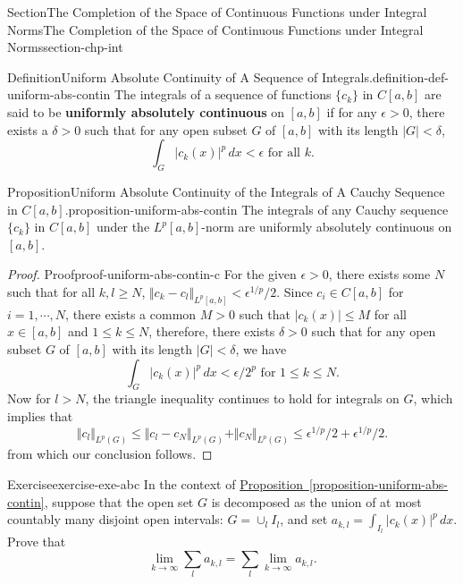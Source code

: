 \documentclass[oneside,10pt,]{article}
\newcommand{\xreffont}{\relax}
\newcommand{\terminology}[1]{\textbf{#1}}
\numberwithin{equation}{section}
\begin{document}
\begin{sectionptx}{Section}{The Completion of the Space of Continuous Functions under Integral Norms}{}{The Completion of the Space of Continuous Functions under Integral Norms}{}{}{section-chp-int}
\begin{definition}{Definition}{Uniform Absolute Continuity of A Sequence of Integrals.}{definition-def-uniform-abs-contin}
The integrals of a sequence of functions \(\{ c_{k}\}\)  in \(C[a, b]\) are said to be \terminology{uniformly absolutely continuous} on \([a, b]\) if for any \(\epsilon > 0\), there exists a \(\delta > 0\) such that for any open subset \(G\) of \([a, b]\) with its length \(|G| < \delta\),%
\begin{equation*}
\int_{G} |c_{k}(x)|^{p}\, dx < \epsilon \text{ for all } k.
\end{equation*}
%
\end{definition}
\begin{proposition}{Proposition}{Uniform Absolute Continuity of the Integrals of A Cauchy Sequence in \(C[a, b]\).}{}{proposition-uniform-abs-contin}%
The integrals of any  Cauchy sequence  \(\{ c_{k}\}\) in \(C[a, b]\) under the \(L^{p}[a,  b]\)-norm are uniformly absolutely continuous on \([a, b]\).\end{proposition}
\begin{proof}{Proof}{}{proof-uniform-abs-contin-c}
For the given \(\epsilon > 0\), there exists some \(N\) such that for all \(k, l \ge N\), \(\Vert c_{k} -c_{l}\Vert_{L^{p}[a,b]} < \epsilon^{1/p}/2\). Since \(c_{i}\in C[a, b]\) for \(i=1,\cdots, N\), there exists a common \(M > 0\) such that \(|c_{k}(x)|\le M\) for all \(x\in [a, b]\) and \(1\le k \le N\), therefore, there exists \(\delta > 0\) such that for any open subset \(G\) of \([a, b]\) with its length \(|G| < \delta\), we have%
\begin{equation*}
\int_{G} |c_{k}(x)|^{p}\, dx < \epsilon/2^{p} \text{ for } 1\le k \le N.
\end{equation*}
Now for \(l > N\), the triangle inequality continues to hold for integrals on \(G\), which implies that%
\begin{equation*}
\Vert c_{l}\Vert_{L^{p}(G)} \le \Vert c_{l}-c_{N}\Vert_{L^{p}(G)}+ \Vert c_{N}\Vert_{L^{p}(G)}
\le  \epsilon^{1/p}/2 +  \epsilon^{1/p}/2.
\end{equation*}
from which our conclusion follows.\end{proof}
\begin{inlineexercise}{Exercise}{}{exercise-exe-abc}%
In the context of \hyperref[proposition-uniform-abs-contin]{Proposition~{\xreffont\ref{proposition-uniform-abs-contin}}}, suppose that the open set \(G\) is decomposed as the union of at most countably many disjoint open intervals: \(G=\cup_{l}I_{l}\), and set \(a_{k, l}=\int_{I_{l}} |c_{k}(x)|^{p}\, dx\). Prove that%
\begin{equation*}
\lim_{k\to\infty} \sum_{l} a_{k, l}= \sum_{l} \lim_{k\to\infty}  a_{k, l}.

\end{equation*}
\end{inlineexercise}
\end{sectionptx}
\end{document}
